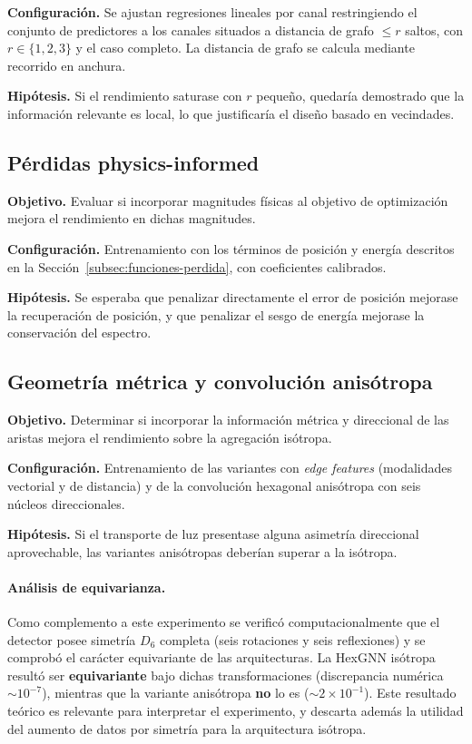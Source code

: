 \textbf{Configuración.} Se ajustan regresiones lineales por canal restringiendo el conjunto de
predictores a los canales situados a distancia de grafo $\leq r$ saltos, con $r \in \{1, 2, 3\}$ y el
caso completo. La distancia de grafo se calcula mediante recorrido en anchura.

\textbf{Hipótesis.} Si el rendimiento saturase con $r$ pequeño, quedaría demostrado que la
información relevante es local, lo que justificaría el diseño basado en vecindades.

\subsection{Pérdidas physics-informed}
\label{subsec:exp-loss}

\textbf{Objetivo.} Evaluar si incorporar magnitudes físicas al objetivo de optimización mejora el
rendimiento en dichas magnitudes.

\textbf{Configuración.} Entrenamiento con los términos de posición y energía descritos en la
Sección~\ref{subsec:funciones-perdida}, con coeficientes calibrados.

\textbf{Hipótesis.} Se esperaba que penalizar directamente el error de posición mejorase la
recuperación de posición, y que penalizar el sesgo de energía mejorase la conservación del espectro.

\subsection{Geometría métrica y convolución anisótropa}
\label{subsec:exp-aniso}

\textbf{Objetivo.} Determinar si incorporar la información métrica y direccional de las aristas
mejora el rendimiento sobre la agregación isótropa.

\textbf{Configuración.} Entrenamiento de las variantes con \emph{edge features} (modalidades
vectorial y de distancia) y de la convolución hexagonal anisótropa con seis núcleos direccionales.

\textbf{Hipótesis.} Si el transporte de luz presentase alguna asimetría direccional aprovechable,
las variantes anisótropas deberían superar a la isótropa.

\paragraph{Análisis de equivarianza.} Como complemento a este experimento se verificó
computacionalmente que el detector posee simetría $D_6$ completa (seis rotaciones y seis
reflexiones) y se comprobó el carácter equivariante de las arquitecturas. La HexGNN isótropa resultó
ser \textbf{equivariante} bajo dichas transformaciones (discrepancia numérica $\sim 10^{-7}$),
mientras que la variante anisótropa \textbf{no} lo es ($\sim 2 \times 10^{-1}$). Este resultado
teórico es relevante para interpretar el experimento, y descarta además la utilidad del aumento de
datos por simetría para la arquitectura isótropa.

